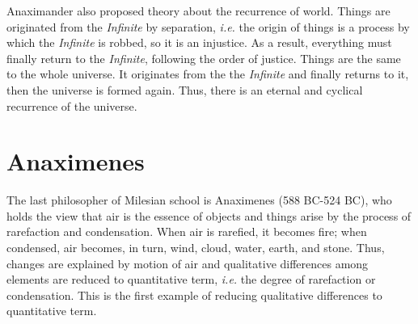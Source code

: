 \documentclass[11pt]{article}
\begin{document}
\newline

Anaximander also proposed theory about the recurrence of world. 
Things are originated from the \textit{Infinite} by separation, \textit{i.e.} the origin of things is a process by which the \textit{Infinite} is robbed, so it is an injustice. 
As a result, everything must finally return to the \textit{Infinite}, following the order of justice. 
Things are the same to the whole universe. 
It originates from the the \textit{Infinite} and finally returns to it, then the universe is formed again. 
Thus, there is an eternal and cyclical recurrence of the universe.
  
\section{Anaximenes}
The last philosopher of Milesian school is Anaximenes (588 BC-524 BC), who holds the view that air is the essence of objects and things arise by the process of rarefaction and condensation. 
When air is rarefied, it becomes fire; when condensed, air becomes, in turn, wind, cloud, water, earth, and stone. 
Thus, changes are explained by motion of air and qualitative differences among elements are reduced to quantitative term, \textit{i.e.} the degree of rarefaction or condensation. 
This is the first example of reducing qualitative differences to quantitative term. 
\end{document}
